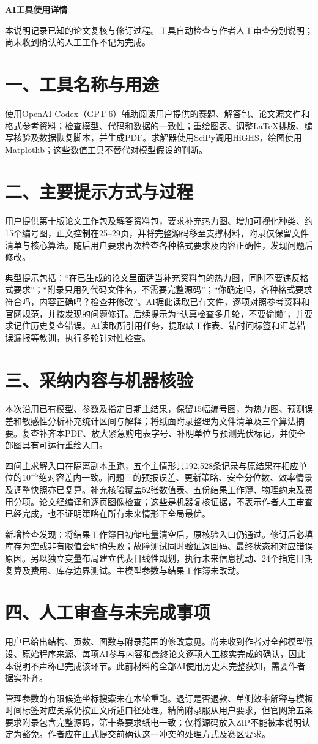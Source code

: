 \documentclass[12pt,a4paper,fontset=windows]{ctexart}
\begin{document}
\begin{center}\Large\bfseries AI工具使用详情\end{center}
\noindent 本说明记录已知的论文复核与修订过程。工具自动检查与作者人工审查分别说明；尚未收到确认的人工工作不记为完成。

\section*{一、工具名称与用途}
使用OpenAI Codex（GPT-6）辅助阅读用户提供的赛题、解答包、论文源文件和格式参考资料；检查模型、代码和数据的一致性；重绘图表、调整LaTeX排版、编写核验及数据恢复脚本，并生成PDF。求解器使用SciPy调用HiGHS，绘图使用Matplotlib；这些数值工具不替代对模型假设的判断。

\section*{二、主要提示方式与过程}
用户提供第十版论文工作包及解答资料包，要求补充热力图、增加可视化种类、约15个编号图，正文控制在25--29页，并将完整源码移至支撑材料，附录仅保留文件清单与核心算法。随后用户要求再次检查各种格式要求及内容正确性，发现问题后修改。

典型提示包括：“在已生成的论文里面适当补充资料包的热力图，同时不要违反格式要求”；“附录只用列代码文件名，不需要完整源码”；“你确定吗，各种格式要求符合吗，内容正确吗？检查并修改”。AI据此读取已有文件，逐项对照参考资料和官网规范，并按发现的问题修订。后续提示为“认真检查多几轮，不要偷懒”，并要求记住历史复查错误。AI读取所引用任务，提取缺工作表、错时间标签和汇总错误漏报等教训，执行多轮针对性检查。

\newpage
\section*{三、采纳内容与机器核验}
本次沿用已有模型、参数及指定日期主结果，保留15幅编号图，为热力图、预测误差和敏感性分析补充统计区间与解释；将纸面附录整理为文件清单及三个算法摘要。复查补齐本PDF、放大紧急购电表字号、补明单位与预测光伏标记，并使全部图具有可运行重绘入口。

四问主求解入口在隔离副本重跑，五个主情形共192,528条记录与原结果在相应单位的$10^{-5}$绝对容差内一致。问题三的预报误差、更新策略、安全分位数、效率情景及调整快照亦已复算。补充核验覆盖52张数值表、五份结果工作簿、物理约束及费用分项。论文经编译和逐页图像检查；这些是机器复核证据，不表示作者人工审查已经完成，也不证明策略在所有未来情形下全局最优。

新增检查发现：将结果工作簿日初储电量清空后，原核验入口仍通过。修订后必填库存为空或非有限值会明确失败；故障测试同时验证返回码、最终状态和对应错误原因。另以独立变量布局建立代表日线性规划，执行未来信息扰动、24个指定日期复算及费用、库存边界测试。主模型参数与结果工作簿未改动。

\section*{四、人工审查与未完成事项}
用户已给出结构、页数、图数与附录范围的修改意见。尚未收到作者对全部模型假设、原始程序来源、每项AI参与内容和最终论文逐项人工核实完成的确认，因此本说明不声称已完成该环节。此前材料的全部AI使用历史未完整获知，需要作者据实补齐。

管理参数的有限候选坐标搜索未在本轮重跑。退订是否退款、单侧效率解释与模板时间标签对应关系仍按正文所述口径处理。精简附录服从用户要求，但官网第五条要求附录包含完整源码，第十条要求纸电一致；仅将源码放入ZIP不能被本说明认定为豁免。作者应在正式提交前确认这一冲突的处理方式及赛区要求。
\end{document}
